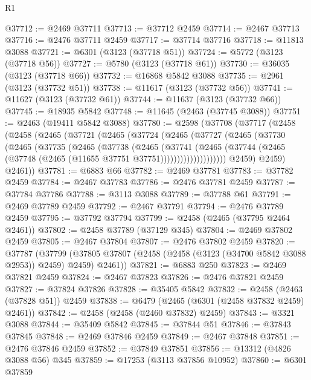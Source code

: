 \begin{lexlean}{R1}
\begin{coremodule}
@37712 := @2469 @37711
@37713 := @37712 @2459
@37714 := @2467 @37713
@37716 := @2476 @37711 @2459
@37717 := @37714 @37716
@37718 := @11813 @3088
@37721 := @6301 (@3123 (@37718 @51))
@37724 := @5772 (@3123 (@37718 @56))
@37727 := @5780 (@3123 (@37718 @61))
@37730 := @36035 (@3123 (@37718 @66))
@37732 := @16868 @5842 @3088
@37735 := @2961 (@3123 (@37732 @51))
@37738 := @11617 (@3123 (@37732 @56))
@37741 := @11627 (@3123 (@37732 @61))
@37744 := @11637 (@3123 (@37732 @66))
@37745 := @18935 @5842
@37748 := @11645 (@2463 (@37745 @3088))
@37751 := @2463 (@19411 @5842 @3088)
@37780 := @2598
    (@37708
      (@37717
        (@2458
          (@2458
            (@2465
              (@37721
                (@2465
                  (@37724
                    (@2465
                      (@37727
                        (@2465
                          (@37730
                            (@2465
                              (@37735
                                (@2465
                                  (@37738
                                    (@2465
                                      (@37741
                                        (@2465
                                          (@37744
                                            (@2465
                                              (@37748
                                                (@2465 (@11655 @37751 @37751))))))))))))))))))))
            @2459)
          @2459)
        @2461))
@37781 := @6883 @66
@37782 := @2469 @37781
@37783 := @37782 @2459
@37784 := @2467 @37783
@37786 := @2476 @37781 @2459
@37787 := @37784 @37786
@37788 := @3113 @3088
@37789 := @37788 @61
@37791 := @2469 @37789 @2459
@37792 := @2467 @37791
@37794 := @2476 @37789 @2459
@37795 := @37792 @37794
@37799 := @2458 (@2465 (@37795 @2464 @2461))
@37802 := @2458 @37789 (@37129 @345)
@37804 := @2469 @37802 @2459
@37805 := @2467 @37804
@37807 := @2476 @37802 @2459
@37820 := @37787
    (@37799 (@37805 @37807 (@2458 (@2458 (@3123 (@34700 @5842 @3088 @2953)) @2459) @2459) @2461))
@37821 := @6883 @250
@37823 := @2469 @37821 @2459
@37824 := @2467 @37823
@37826 := @2476 @37821 @2459
@37827 := @37824 @37826
@37828 := @35405 @5842
@37832 := @2458 (@2463 (@37828 @51)) @2459
@37838 := @6479 (@2465 (@6301 (@2458 @37832 @2459) @2461))
@37842 := @2458 (@2458 (@2460 @37832) @2459)
@37843 := @3321 @3088
@37844 := @35409 @5842
@37845 := @37844 @51
@37846 := @37843 @37845
@37848 := @2469 @37846 @2459
@37849 := @2467 @37848
@37851 := @2476 @37846 @2459
@37852 := @37849 @37851
@37856 := @13312 (@4826 @3088 @56) @345
@37859 := @17253 (@3113 @37856 @10952)
@37860 := @6301 @37859

\end{coremodule}
\end{lexlean}
